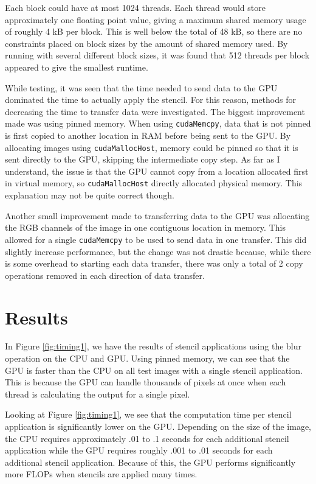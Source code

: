 \documentclass[a4paper]{article}
\begin{document}
Each block could have at most 1024
threads. Each thread would store approximately one floating point value, giving a maximum shared memory usage of roughly 4 kB per block. This is well
below the total of 48 kB, so there are no constraints placed on block sizes by the amount of shared memory used. By running with several different
block sizes, it was found that 512 threads per block appeared to give the smallest runtime.

While testing, it was seen that the time needed to send data to the GPU dominated the time to actually apply the stencil. For this reason, methods for
decreasing the time to transfer data were investigated. The biggest improvement made was using pinned memory. When using \texttt{cudaMemcpy}, data
that is not pinned is first copied to another location in RAM before being sent to the GPU. By allocating images using \texttt{cudaMallocHost}, memory
could be pinned so that it is sent directly to the GPU, skipping the intermediate copy step. As far as I understand, the issue is that the GPU cannot
copy from a location allocated first in virtual memory, so \texttt{cudaMallocHost} directly allocated physical memory. This explanation may not be
quite correct though.

Another small improvement made to transferring data to the GPU was allocating the RGB channels of the image in one contiguous location in memory. This
allowed for a single \texttt{cudaMemcpy} to be used to send data in one transfer. This did slightly increase performance, but the change was not
drastic because, while there is some overhead to starting each data transfer, there was only a total of 2 copy operations removed in each direction of
data transfer.

\section{Results}

In Figure \ref{fig:timing1}, we have the results of stencil applications using the blur operation on the CPU and GPU. Using pinned memory, we can see
that the GPU is faster than the CPU on all test images with a single stencil application. This is because the GPU can handle thousands of pixels at
once when each thread is calculating the output for a single pixel.

Looking at Figure \ref{fig:timing1}, we see that the computation time per stencil application is significantly lower on the GPU. Depending on the size
of the image, the CPU requires approximately .01 to .1 seconds for each additional stencil application while the GPU requires roughly .001 to .01
seconds for each additional stencil application. Because of this, the GPU performs significantly more FLOPs when stencils are applied many times.
\end{document}
